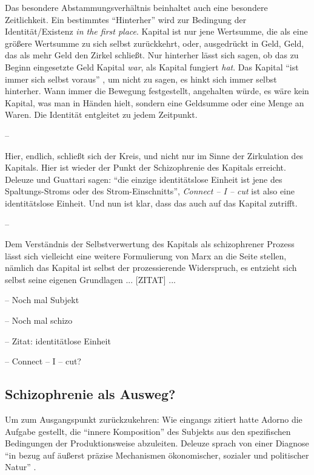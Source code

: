 \documentclass[12pt,
               DIV13,
               paper=a4,
               twoside=false,
               onehalfspacing,
               bibliography=totoc,
               toc=graduated,
               draft,
               ]{scrartcl}
\newcommand{\pc}[2]{\parencite[#1]{#2}}
\newcommand{\cic}{Connect -- I -- cut\xspace}
\newcommand{\dg}{Deleuze und Guattari\xspace}
\begin{document}
Das besondere Abstammungsverhältnis beinhaltet auch eine besondere
Zeitlichkeit. Ein bestimmtes "`Hinterher"' wird zur Bedingung der
Identität/Existenz \emph{in the first place}. Kapital ist nur jene
Wertsumme, die als eine größere Wertsumme zu sich selbst zurückkehrt,
oder, ausgedrückt in Geld, Geld, das als mehr Geld den Zirkel
schließt. Nur hinterher lässt sich sagen, ob das zu Beginn eingesetzte
Geld Kapital \emph{war}, als Kapital fungiert \emph{hat}. Das Kapital
"`ist immer sich selbst voraus"' \pc{125}{strauss}, um nicht zu sagen,
es hinkt sich immer selbst hinterher. Wann immer die Bewegung
festgestellt, angehalten würde, es wäre kein Kapital, was man in
Händen hielt, sondern eine Geldsumme oder eine Menge an Waren. Die
Identität entgleitet zu jedem Zeitpunkt.

--

Hier, endlich, schließt sich der Kreis, und nicht nur im Sinne der
Zirkulation des Kapitals. Hier ist wieder der Punkt der Schizophrenie
des Kapitals erreicht. \dg sagen: "`die einzige identitätslose Einheit
ist jene des Spaltungs-Stroms oder des Strom-Einschnitts"',
\emph{\cic} ist also eine identitätslose Einheit. Und nun ist klar,
dass das auch auf das Kapital zutrifft.

--

Dem Verständnis der Selbstverwertung des Kapitals als schizophrener
Prozess lässt sich vielleicht eine weitere Formulierung von Marx an
die Seite stellen, nämlich das Kapital ist selbst der prozessierende
Widerspruch, es entzieht sich selbst seine eigenen Grundlagen ...
[ZITAT] ...

-- Noch mal Subjekt

-- Noch mal schizo

-- Zitat: identitätlose Einheit

-- \cic?



\subsection{Schizophrenie als Ausweg?}

Um zum Ausgangspunkt zurückzukehren: Wie eingangs zitiert hatte Adorno
die Aufgabe gestellt, die "`innere Komposition"' \pc{261}{min} des
Subjekts aus den spezifischen Bedingungen der Produktionsweise
abzuleiten. Deleuze sprach von einer Diagnose "`in bezug auf äußerst
präzise Mechanismen ökonomischer, sozialer und politischer Natur"'
\pc{28}{schizg}.
\end{document}
